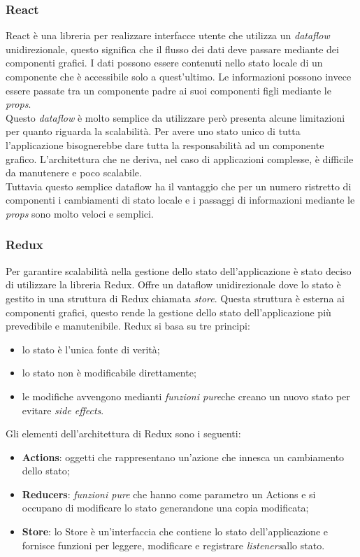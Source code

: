 \subsubsection*{React}
React è una libreria per realizzare interfacce utente che utilizza un \emph{dataflow} unidirezionale, questo significa che il flusso dei dati deve passare mediante dei componenti grafici. I dati possono essere contenuti nello stato locale di un componente che è accessibile solo a quest'ultimo. Le informazioni possono invece essere passate tra un componente padre ai suoi componenti figli mediante le \emph{props}\glo. \\
Questo \emph{dataflow} è molto semplice da utilizzare però presenta alcune limitazioni per quanto riguarda la scalabilità. Per avere uno stato unico di tutta l'applicazione bisognerebbe dare tutta la responsabilità ad un componente grafico. L'architettura che ne deriva, nel caso di applicazioni complesse, è difficile da manutenere e poco scalabile. \\
Tuttavia questo semplice dataflow ha il vantaggio che per un numero ristretto di componenti i cambiamenti di stato locale e i passaggi di informazioni mediante le \emph{props} sono molto veloci e semplici.

\subsubsection*{Redux}
Per garantire scalabilità nella gestione dello stato dell'applicazione è stato deciso di utilizzare la libreria Redux. Offre un dataflow unidirezionale dove lo stato è gestito in una struttura di Redux chiamata \emph{store}. Questa struttura è esterna ai componenti grafici, questo rende la gestione dello stato dell'applicazione più prevedibile e manutenibile. Redux si basa su tre principi:
\begin{itemize}
	\item lo stato è l'unica fonte di verità;
	\item lo stato non è modificabile direttamente;
	\item le modifiche avvengono medianti \emph{funzioni pure}\glosp che creano un nuovo stato per evitare \emph{side effects}\glo.
\end{itemize}

\noindent
Gli elementi dell'architettura di Redux sono i seguenti:
\begin{itemize}
	\item \textbf{Actions}: oggetti che rappresentano un'azione che innesca un cambiamento dello stato;
	\item \textbf{Reducers}: \emph{funzioni pure} che hanno come parametro un Actions e si occupano di modificare lo stato generandone una copia modificata;
	\item \textbf{Store}: lo Store è un'interfaccia che contiene lo stato dell'applicazione e fornisce funzioni per leggere, modificare e registrare \emph{listeners}\glosp allo stato.
\end{itemize}

